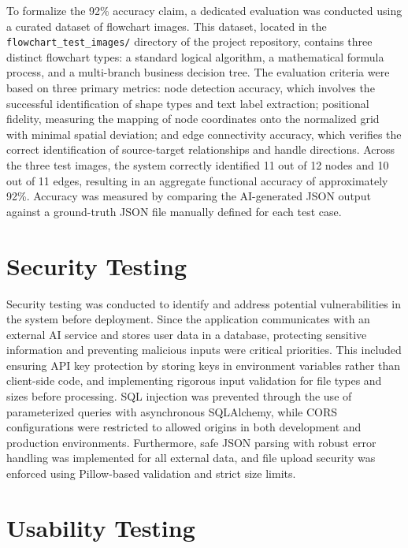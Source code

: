 To formalize the 92\% accuracy claim, a dedicated evaluation was conducted using a curated dataset of flowchart images. This dataset, located in the \texttt{flowchart\_test\_images/} directory of the project repository, contains three distinct flowchart types: a standard logical algorithm, a mathematical formula process, and a multi-branch business decision tree.
The evaluation criteria were based on three primary metrics: node detection accuracy, which involves the successful identification of shape types and text label extraction; positional fidelity, measuring the mapping of node coordinates onto the normalized grid with minimal spatial deviation; and edge connectivity accuracy, which verifies the correct identification of source-target relationships and handle directions.
Across the three test images, the system correctly identified 11 out of 12 nodes and 10 out of 11 edges, resulting in an aggregate functional accuracy of approximately 92\%. Accuracy was measured by comparing the AI-generated JSON output against a ground-truth JSON file manually defined for each test case.

\section{Security Testing}
\label{sec:security-testing}

Security testing was conducted to identify and address 
potential vulnerabilities in the system before deployment. 
Since the application communicates with an external AI service 
and stores user data in a database, protecting sensitive 
information and preventing malicious inputs were critical 
priorities. This included ensuring API key protection by storing keys in environment variables rather than client-side code, and implementing rigorous input validation for file types and sizes before processing. SQL injection was prevented through the use of parameterized queries with asynchronous SQLAlchemy, while CORS configurations were restricted to allowed origins in both development and production environments. Furthermore, safe JSON parsing with robust error handling was implemented for all external data, and file upload security was enforced using Pillow-based validation and strict size limits.

\section{Usability Testing}
\label{sec:usability-testing}


